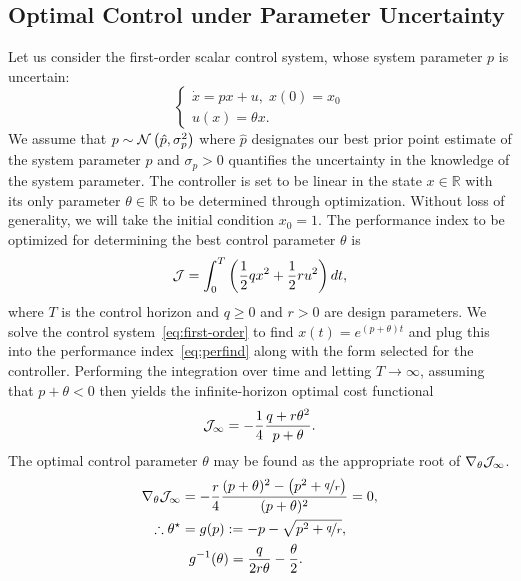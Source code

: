 \subsection{Optimal Control under Parameter Uncertainty}
%
Let us consider the first-order scalar control system, whose system parameter
$p$ is uncertain: 
%
\begin{equation} \begin{cases} \dot{x} = px + u, \; x(0) =
  x_0 \\ u(x) = \theta x.  \end{cases} \label{eq:first-order} \end{equation}
%
We assume that $p \sim \mathcal{N}\left(\hat{p}, \sigma_p^2\right)$ where $\hat{p}$
designates our best prior point estimate of the system parameter $p$ and
$\sigma_p > 0$ quantifies the uncertainty in the knowledge of the system
parameter. The controller is set to be linear in the state $x \in \mathbb{R}$
with its only parameter $\theta \in \mathbb{R}$ to be determined through
optimization. Without loss of generality, we will take the initial
condition $x_0 = 1$. The performance index to be optimized for determining the
best control parameter $\theta$ is
%
\begin{equation} \mathcal{J} = \int_0^T \left(\frac{1}{2}qx^2 + \frac{1}{2}ru^2 \right) dt,
\label{eq:perfind} \end{equation}
%
where $T$ is the control horizon and $q \geq 0$ and $r > 0$ are design
parameters. We solve the control system~\eqref{eq:first-order} to find $x(t) =
e^{(p+\theta)t}$ and plug this into the performance index~\eqref{eq:perfind}
along with the form selected for the controller. Performing the integration over
time and letting $T \to \infty$, assuming that $p+\theta < 0$ then yields the
infinite-horizon optimal cost functional
\begin{equation} \mathcal{J}_\infty = -\frac{1}{4}\frac{q+r\theta^2}{p+\theta}.
\label{eq:inf-time-integrated-cost} \end{equation}
%
The optimal control parameter $\theta$ may be found as the appropriate root of
$\nabla_\theta \mathcal{J}_\infty$. 
%
\begin{align} 
    \begin{split} 
        \nabla_\theta \mathcal{J}_\infty &= -\frac{r}{4}\frac{(p+\theta)^2 - \left(p^2
        + \nicefrac{q}{r}\right)}{(p+\theta)^2} = 0, \\ 
        \therefore \theta^\star &= g(p) :=-p - \sqrt{p^2 + \nicefrac{q}{r}}, \\
        &\hspace{2mm} g^{-1}(\theta) = \frac{q}{2r\theta} - \frac{\theta}{2}.
    \end{split} 
    \label{eq:optimal_theta} 
\end{align}
